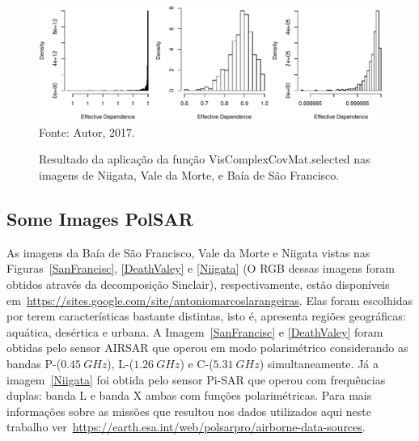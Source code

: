 \documentclass[a4paper,12pt]{article}
\begin{document}
\begin{figure}[h]
\centering
\caption{Resultado da aplicação da função VisComplexCovMat.selected nas imagens de Niigata, Vale da Morte, e Baía de São Francisco.}
\includegraphics[width=\linewidth]{../../Figuras/histD_e-Niigata-DeathValey-SanFrancisc-rangedif.pdf}\\
Fonte: Autor, 2017.
\label{comparacao-Niig-Death-San}
\end{figure}  



\subsection{Some Images Pol{SAR}}

As imagens da Baía de São Francisco, Vale da Morte e Niigata vistas nas Figuras~\ref{SanFrancisc}, \ref{DeathValey} e \ref{Niigata} (O RGB dessas imagens foram obtidos através da decomposição Sinclair), respectivamente, estão disponíveis em~\url{https://sites.google.com/site/antoniomarcoslarangeiras}. Elas foram escolhidas por terem características bastante distintas, isto é, apresenta regiões geográficas: aquática, desértica e urbana. A Imagem~\ref{SanFrancisc} e  \ref{DeathValey} foram obtidas pelo sensor AIRSAR que operou em modo polarimétrico considerando as bandas P-($0.45~GHz$), L-($1.26~GHz$) e C-($5.31~GHz$) simultaneamente.  Já a imagem~\ref{Niigata} foi obtida pelo sensor Pi-SAR que operou com frequências duplas: banda L e banda X ambas com funções polarimétricas. Para mais informações sobre as missões que resultou nos dados utilizados aqui neste trabalho ver~\url{https://earth.esa.int/web/polsarpro/airborne-data-sources}. 
\end{document}
